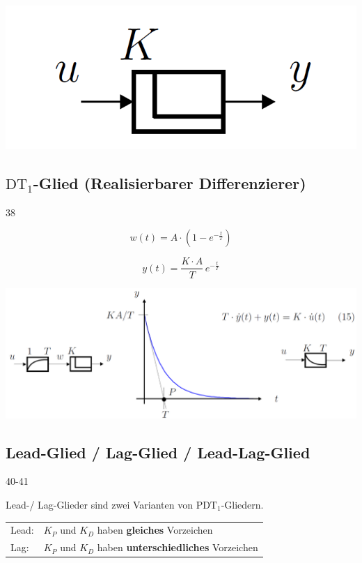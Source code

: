 \hfill
\begin{minipage}{0.25\columnwidth}
    \includegraphics[width=0.9\columnwidth]{images/D-glied_symbol}
\end{minipage}


\subsection[DT1-Glied (Realisierbarer Differenzierer)]{$\text{DT}_1$-Glied (Realisierbarer Differenzierer)}{38}

\begin{minipage}{0.48\columnwidth}  
    $$ \boxed{ w(t) = A \cdot (1 - e^{-\frac{t}{T}}) } $$
\end{minipage}
\hfill
\begin{minipage}{0.48\columnwidth}
    $$ \boxed{ y(t) = \frac{K \cdot A}{T} \,  e^{-\frac{t}{T}} } $$
\end{minipage}

\includegraphics[width=\columnwidth]{images/DT1-glied}


\subsection{Lead-Glied / Lag-Glied / Lead-Lag-Glied}{40-41}

Lead-/ Lag-Glieder sind zwei Varianten von $\text{PDT}_1$-Gliedern. 

\begin{tabular}{ll}
    Lead:   & $K_P$ und $K_D$ haben \textbf{gleiches} Vorzeichen \\
    Lag:    & $K_P$ und $K_D$ haben \textbf{unterschiedliches} Vorzeichen \\
\end{tabular}

